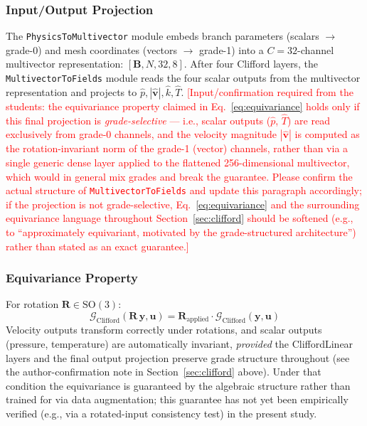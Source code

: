 \documentclass[journal]{IEEEtran}
\begin{document}
\subsubsection{Input/Output Projection}
The \texttt{PhysicsToMultivector} module embeds branch parameters (scalars $\to$ grade-0) and mesh coordinates (vectors $\to$ grade-1) into a $C = 32$-channel multivector representation: $[\bm{B}, N, 32, 8]$. After four Clifford layers, the \texttt{MultivectorToFields} module reads the four scalar outputs from the multivector representation and projects to $\hat p, |\hat{\bm v}|, \hat k, \hat T$. \textcolor{red}{[Input/confirmation required from the students: the equivariance property claimed in Eq.~\ref{eq:equivariance} holds only if this final projection is \emph{grade-selective} --- i.e., scalar outputs ($\hat p$, $\hat T$) are read exclusively from grade-0 channels, and the velocity magnitude $|\hat{\bm v}|$ is computed as the rotation-invariant norm of the grade-1 (vector) channels, rather than via a single generic dense layer applied to the flattened 256-dimensional multivector, which would in general mix grades and break the guarantee. Please confirm the actual structure of \texttt{MultivectorToFields} and update this paragraph accordingly; if the projection is not grade-selective, Eq.~\ref{eq:equivariance} and the surrounding equivariance language throughout Section~\ref{sec:clifford} should be softened (e.g., to ``approximately equivariant, motivated by the grade-structured architecture'') rather than stated as an exact guarantee.]}

\subsubsection{Equivariance Property}
For rotation $\bm{R} \in \text{SO}(3)$:
\begin{equation}
\mathcal{G}_\text{Clifford}(\bm{R}\,\bm{y}, \bm{u}) = \bm{R}_\text{applied} \cdot \mathcal{G}_\text{Clifford}(\bm{y}, \bm{u})
\label{eq:equivariance}
\end{equation}
Velocity outputs transform correctly under rotations, and scalar outputs (pressure, temperature) are automatically invariant, \emph{provided} the CliffordLinear layers and the final output projection preserve grade structure throughout (see the author-confirmation note in Section~\ref{sec:clifford} above). Under that condition the equivariance is guaranteed by the algebraic structure rather than trained for via data augmentation; this guarantee has not yet been empirically verified (e.g., via a rotated-input consistency test) in the present study.
\end{document}
